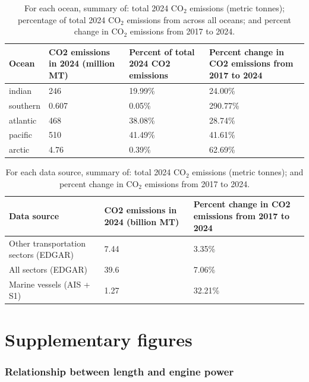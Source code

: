 \documentclass[
  letterpaper,
  DIV=11,
  numbers=noendperiod]{scrartcl}
\begin{document}
\begin{table}[!h]
\centering
\caption{\label{tab:emissions_by_ocean_summary_tbl}For each ocean, summary of: total 2024 CO$_2$ emissions (metric tonnes); percentage of total 2024 CO$_2$ emissions from across all oceans; and percent change in CO$_2$ emissions from 2017 to 2024.}
\centering
\fontsize{8}{10}\selectfont
\begin{tabular}[t]{l|l|l|l}
\hline
Ocean & CO2 emissions in 2024 (million MT) & Percent of total 2024 CO2 emissions & Percent change in CO2 emissions from 2017 to 2024\\
\hline
indian & 246 & 19.99\% & 24.00\%\\
\hline
southern & 0.607 & 0.05\% & 290.77\%\\
\hline
atlantic & 468 & 38.08\% & 28.74\%\\
\hline
pacific & 510 & 41.49\% & 41.61\%\\
\hline
arctic & 4.76 & 0.39\% & 62.69\%\\
\hline
\end{tabular}
\end{table}

\begin{table}[!h]
\centering
\caption{\label{tab:emissions_by_data_source_summary_tbl}For each data source, summary of: total 2024 CO$_2$ emissions (metric tonnes); and percent change in CO$_2$ emissions from 2017 to 2024.}
\centering
\fontsize{8}{10}\selectfont
\begin{tabular}[t]{l|l|l}
\hline
Data source & CO2 emissions in 2024 (billion MT) & Percent change in CO2 emissions from 2017 to 2024\\
\hline
Other transportation sectors (EDGAR) & 7.44 & 3.35\%\\
\hline
All sectors (EDGAR) & 39.6 & 7.06\%\\
\hline
Marine vessels (AIS + S1) & 1.27 & 32.21\%\\
\hline
\end{tabular}
\end{table}

\section{Supplementary figures}\label{supplementary-figures}

\subsubsection{Relationship between length and engine
power}\label{relationship-between-length-and-engine-power}
\end{document}
